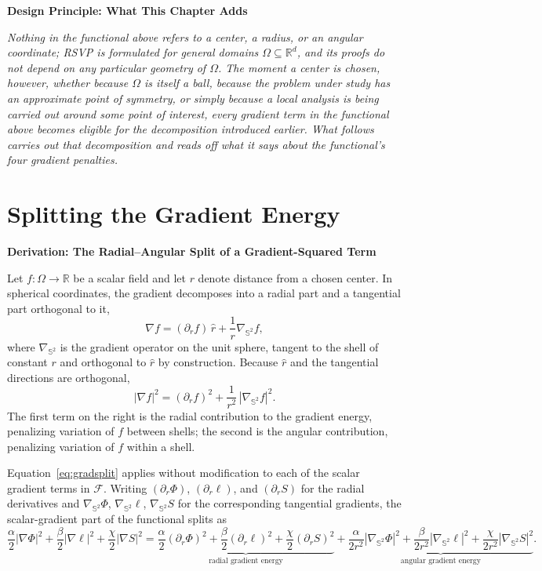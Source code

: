 \documentclass[11pt,fleqn]{book}
\numberwithin{equation}{chapter}
\newenvironment{principle}[1]
  {\begin{principleEnv}
   \noindent\textbf{Design Principle: #1}\par\smallskip\itshape}
  {\end{principleEnv}}
\newenvironment{derivation}[1]
  {\begin{derivationEnv}
   \noindent\textbf{Derivation: #1}\par\smallskip}
  {\end{derivationEnv}}
\theoremstyle{plain}
\theoremstyle{definition}
\theoremstyle{remark}
\newcommand{\Sphere}{\mathbb{S}^{2}}
\newcommand{\R}{\mathbb{R}}
\begin{document}
\begin{principle}{What This Chapter Adds}
Nothing in the functional above refers to a center, a radius, or an angular coordinate; RSVP is formulated for general domains \(\Omega\subseteq\R^d\), and its proofs do not depend on any particular geometry of \(\Omega\). The moment a center is chosen, however, whether because \(\Omega\) is itself a ball, because the problem under study has an approximate point of symmetry, or simply because a local analysis is being carried out around some point of interest, every gradient term in the functional above becomes eligible for the decomposition introduced earlier. What follows carries out that decomposition and reads off what it says about the functional's four gradient penalties.
\end{principle}

\section{Splitting the Gradient Energy}

\begin{derivation}{The Radial--Angular Split of a Gradient-Squared Term}
Let \(f:\Omega\to\R\) be a scalar field and let \(r\) denote distance from a chosen center. In spherical coordinates, the gradient decomposes into a radial part and a tangential part orthogonal to it,
\[
\nabla f = (\partial_r f)\,\hat r + \frac{1}{r}\nabla_{\Sphere} f,
\]
where \(\nabla_{\Sphere}\) is the gradient operator on the unit sphere, tangent to the shell of constant \(r\) and orthogonal to \(\hat r\) by construction. Because \(\hat r\) and the tangential directions are orthogonal,
\begin{equation}
|\nabla f|^2 = (\partial_r f)^2 + \frac{1}{r^2}\,|\nabla_{\Sphere} f|^2.
\label{eq:gradsplit}
\end{equation}
The first term on the right is the radial contribution to the gradient energy, penalizing variation of \(f\) between shells; the second is the angular contribution, penalizing variation of \(f\) within a shell.
\end{derivation}

Equation~\eqref{eq:gradsplit} applies without modification to each of the scalar gradient terms in \(\mathcal F\). Writing \((\partial_r\Phi)\), \((\partial_r\ell)\), and \((\partial_rS)\) for the radial derivatives and \(\nabla_{\Sphere}\Phi\), \(\nabla_{\Sphere}\ell\), \(\nabla_{\Sphere}S\) for the corresponding tangential gradients, the scalar-gradient part of the functional splits as
\begin{equation}
\frac{\alpha}{2}|\nabla\Phi|^2 + \frac{\beta}{2}|\nabla\ell|^2 + \frac{\chi}{2}|\nabla S|^2
=
\underbrace{\frac{\alpha}{2}(\partial_r\Phi)^2 + \frac{\beta}{2}(\partial_r\ell)^2 + \frac{\chi}{2}(\partial_rS)^2}_{\text{radial gradient energy}}
+
\underbrace{\frac{\alpha}{2r^2}|\nabla_{\Sphere}\Phi|^2 + \frac{\beta}{2r^2}|\nabla_{\Sphere}\ell|^2 + \frac{\chi}{2r^2}|\nabla_{\Sphere}S|^2}_{\text{angular gradient energy}}.
\end{equation}
\end{document}
